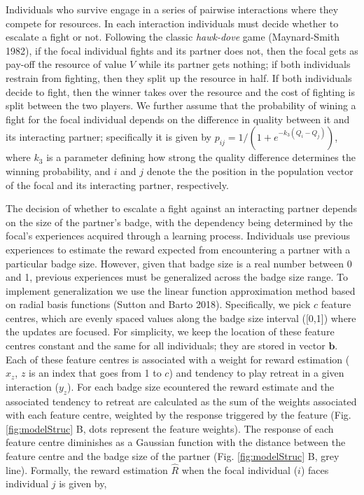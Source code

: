 \documentclass[
  12pt,
]{article}
\begin{document}
Individuals who survive engage in a series of pairwise interactions
where they compete for resources. In each interaction individuals must
decide whether to escalate a fight or not. Following the classic
\emph{hawk-dove} game (Maynard-Smith 1982), if the focal individual
fights and its partner does not, then the focal gets as pay-off the
resource of value \(V\) while its partner gets nothing; if both
individuals restrain from fighting, then they split up the resource in
half. If both individuals decide to fight, then the winner takes over
the resource and the cost of fighting is split between the two players.
We further assume that the probability of wining a fight for the focal
individual depends on the difference in quality between it and its
interacting partner; specifically it is given by
\(p_{ij}=1/(1+e^{-k_3(Q_i-Q_j)})\), where \(k_3\) is a parameter
defining how strong the quality difference determines the winning
probability, and \(i\) and \(j\) denote the the position in the
population vector of the focal and its interacting partner,
respectively.

The decision of whether to escalate a fight against an interacting
partner depends on the size of the partner's badge, with the dependency
being determined by the focal's experiences acquired through a learning
process. Individuals use previous experiences to estimate the reward
expected from encountering a partner with a particular badge size.
However, given that badge size is a real number between 0 and 1,
previous experiences must be generalized across the badge size range. To
implement generalization we use the linear function approximation method
based on radial basis functions (Sutton and Barto 2018). Specifically,
we pick \(c\) feature centres, which are evenly spaced values along the
badge size interval ({[}0,1{]}) where the updates are focused. For
simplicity, we keep the location of these feature centres constant and
the same for all individuals; they are stored in vector \(\symbf{b}\).
Each of these feature centres is associated with a weight for reward
estimation (\(x_z\), \(z\) is an index that goes from 1 to \(c\)) and
tendency to play retreat in a given interaction (\(y_z\)). For each
badge size ecountered the reward estimate and the associated tendency to
retreat are calculated as the sum of the weights associated with each
feature centre, weighted by the response triggered by the feature (Fig.
\ref{fig:modelStruc} B, dots represent the feature weights). The
response of each feature centre diminishes as a Gaussian function with
the distance between the feature centre and the badge size of the
partner (Fig. \ref{fig:modelStruc} B, grey line). Formally, the reward
estimation \(\hat{R}\) when the focal individual (\(i\)) faces
individual \(j\) is given by,
\end{document}
